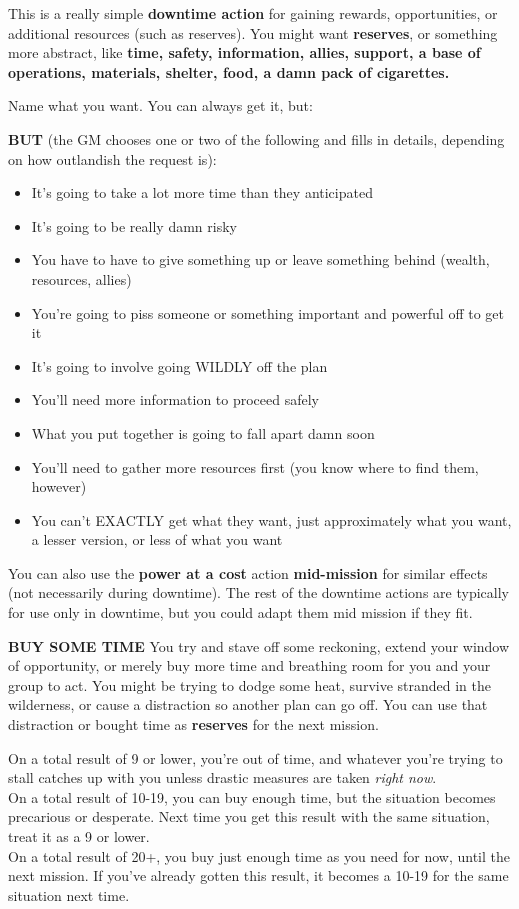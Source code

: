 This is a really simple \textbf{downtime action} for gaining rewards, opportunities, or additional resources (such as reserves). You might want \textbf{reserves}, or something more abstract, like \textbf{time, safety, information, allies, support, a base of operations, materials, shelter, food, a damn pack of cigarettes.} 

Name what you want. You can always get it, but:

\textbf{BUT} (the GM chooses one or two of the following and fills in details, depending on how outlandish the request is):
\begin{itemize}
\item It's going to take a lot more time than they anticipated
\item It's going to be really damn risky
\item You have to have to give something up or leave something behind (wealth, resources, allies)
\item You're going to piss someone or something important and powerful off to get it
\item It's going to involve going WILDLY off the plan
\item You'll need more information to proceed safely
\item What you put together is going to fall apart damn soon
\item You'll need to gather more resources first (you know where to find them, however)
\item You can't EXACTLY get what they want, just approximately what you want, a lesser version, or less of what you want
\end{itemize}  

You can also use the \textbf{power at a cost} action \textbf{mid-mission} for similar effects (not necessarily during downtime). The rest of the downtime actions are typically for use only in downtime, but you could adapt them mid mission if they fit.


\textbf{BUY SOME TIME}
You try and stave off some reckoning, extend your window of opportunity, or merely buy more time and breathing room for you and your group to act. You might be trying to dodge some heat, survive stranded in the wilderness, or cause a distraction so another plan can go off. You can use that distraction or bought time as \textbf{reserves} for the next mission.

On a total result of 9 or lower, you're out of time, and whatever you're trying to stall catches up with you unless drastic measures are taken \textit{right now}.\\
On a total result of 10-19, you can buy enough time, but the situation becomes precarious or desperate. Next time you get this result with the same situation, treat it as a 9 or lower.\\
On a total result of 20+, you buy just enough time as you need for now, until the next mission. If you've already gotten this result, it becomes a 10-19 for the same situation next time.

